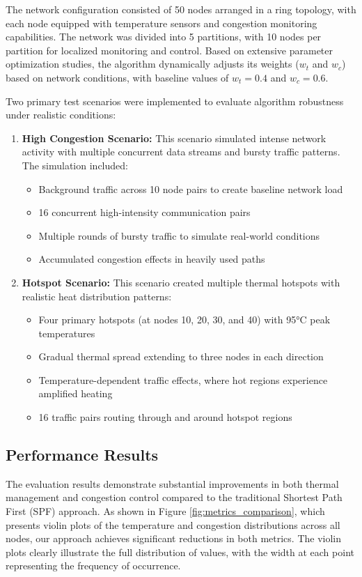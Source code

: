 \documentclass[conference]{IEEEtran}
\begin{document}
The network configuration consisted of 50 nodes arranged in a ring topology, with each node equipped with temperature sensors and congestion monitoring capabilities. The network was divided into 5 partitions, with 10 nodes per partition for localized monitoring and control. Based on extensive parameter optimization studies, the algorithm dynamically adjusts its weights ($w_t$ and $w_c$) based on network conditions, with baseline values of $w_t = 0.4$ and $w_c = 0.6$.

Two primary test scenarios were implemented to evaluate algorithm robustness under realistic conditions:

\begin{enumerate}
    \item \textbf{High Congestion Scenario:} This scenario simulated intense network activity with multiple concurrent data streams and bursty traffic patterns. The simulation included:
    \begin{itemize}
        \item Background traffic across 10 node pairs to create baseline network load
        \item 16 concurrent high-intensity communication pairs
        \item Multiple rounds of bursty traffic to simulate real-world conditions
        \item Accumulated congestion effects in heavily used paths
    \end{itemize}
    
    \item \textbf{Hotspot Scenario:} This scenario created multiple thermal hotspots with realistic heat distribution patterns:
    \begin{itemize}
        \item Four primary hotspots (at nodes 10, 20, 30, and 40) with 95°C peak temperatures
        \item Gradual thermal spread extending to three nodes in each direction
        \item Temperature-dependent traffic effects, where hot regions experience amplified heating
        \item 16 traffic pairs routing through and around hotspot regions
    \end{itemize}
\end{enumerate}

\subsection{Performance Results}
The evaluation results demonstrate substantial improvements in both thermal management and congestion control compared to the traditional Shortest Path First (SPF) approach. As shown in Figure \ref{fig:metrics_comparison}, which presents violin plots of the temperature and congestion distributions across all nodes, our approach achieves significant reductions in both metrics. The violin plots clearly illustrate the full distribution of values, with the width at each point representing the frequency of occurrence.
\end{document}
